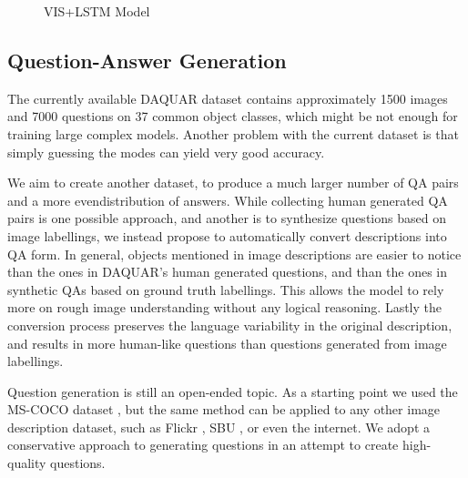 \documentclass{article}
\renewcommand{\*}[1]{\textbf{#1}}
\begin{document}
\begin{figure}
\centering
\scalebox{0.7}{
}
\caption{VIS+LSTM Model}
\label{fig:imgword}
\end{figure}

\subsection{Question-Answer Generation}
The currently available DAQUAR dataset contains approximately 1500 images and
7000 questions on 37 common object classes, which might be not enough for
training large complex models. Another problem with the current dataset is
that simply guessing the modes can yield very good accuracy. 

We aim to create another dataset, to produce a much larger number of QA pairs 
and a more evendistribution of answers. While collecting human generated QA 
pairs is one possible approach, and another is to synthesize questions based on 
image labellings, we instead propose to automatically convert descriptions 
into QA form. In general, objects mentioned in image descriptions are easier to 
notice than the ones in DAQUAR's human generated questions, and than the ones 
in synthetic QAs based on ground truth labellings. This allows the model to 
rely more on rough image understanding without any logical reasoning. Lastly 
the conversion process preserves the language variability in the original 
description, and results in more human-like questions than questions generated 
from image labellings.

Question generation is still an open-ended topic. As a starting point we used 
the MS-COCO dataset \cite{mscoco}, but the same method can be applied to any 
other image description dataset, such as Flickr \cite{flickr8k}, SBU 
\cite{ordonez11}, or even the internet. We adopt a conservative approach to 
generating questions in an attempt to create high-quality questions.
\end{document}
